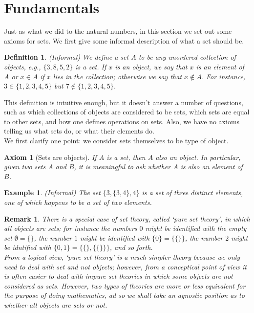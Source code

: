 \documentclass[a4paper]{book}
\theoremstyle{break}
\newtheorem{definition}{Definition}[section]
\newtheorem{axiom}{Axiom}[chapter]
\newtheorem{example}{Example}[section]
\newtheorem{remark}{Remark}[section]
\begin{document}
		\section{Fundamentals}
			Just as what we did to the natural numbers, in this section we set out some axioms for sets. We first give some informal description of what a set should be.
			\begin{definition}
				(Informal) We define a set $A$ to be any unordered collection of objects, e.g., $\{3,8,5,2\}$ is a set. If $x$ is an object, we say that $x$ is an element of $A$ or $x\in A$ if $x$ lies in the collection; otherwise we say that $x\notin A$. For instance, $3\in \{1,2,3,4,5\}$ but $7\notin \{1,2,3,4,5\}$.
			\end{definition}
			This definition is intuitive enough, but it doesn't answer a number of questions, such as which collections of objects are considered to be sets, which sets are equal to other sets, and how one defines operations on sets. Also, we have no axioms telling us what sets do, or what their elements do.\\
			We first clarify one point: we consider sets themselves to be type of object.
			\begin{axiom}[Sets are objects]
				If $A$ is a set, then $A$ also an object. In particular, given two sets $A$ and $B$, it is meaningful to ask whether $A$ is also an element of $B$.
			\end{axiom}
			\begin{example}
				(Informal) The set $\{3,\{3,4\},4\}$ is a set of three distinct elements, one of which happens to be a set of two elements.
			\end{example}
			\begin{remark}
				There is a special case of set theory, called `pure set theory', in which \textit{all} objects are sets; for instance the numbers $0$ might be identified with the empty set $\emptyset=\{\}$, the number $1$ might be identified with $\{0\}=\{\{\}\}$, the number $2$ might be idntified with $\{0,1\}=\{\{\},\{\{\}\}\}$, and so forth.\\
				From a logical view, `pure set theory' is a much simpler theory because we only need to deal with set and not objects; however, from a conceptical point of view it is often easier to deal with impure set theories in which some objects are not considered as sets. However, two types of theories are more or less equivalent for the purpose of doing mathematics, ad so we shall take an agnostic position as to whether all objects are sets or not.
			\end{remark}
\end{document}
